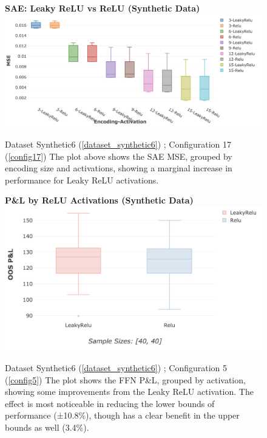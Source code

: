 \documentclass[a4paper,11pt,oneside]{article}
\theoremstyle{plain}
\theoremstyle{definition}
\begin{document}
	\begin{figure}[H]
		\centering 
		\textbf{SAE: Leaky ReLU vs ReLU (Synthetic Data)} 
		\includegraphics[scale=0.4]{images/results/8_appendix/synthetic_mse_leakyrelu.png}
		\caption[SAE: Leaky ReLU vs. ReLU (Synthetic Data)]{Dataset Synthetic6  (\ref{dataset_synthetic6}) ; Configuration 17 (\ref{config17})
			\newline The plot above shows the SAE MSE, grouped by encoding size and activations, showing a marginal increase in performance for Leaky ReLU activations. }
		\label{figure-synthetic_mse_leakyrelu}
	\end{figure}
	
	\begin{figure}[H]
		\textbf{P\&L by ReLU Activations (Synthetic Data)}
		\centering
		\includegraphics[scale=0.4]{images/results/8_appendix/synthetic_pl_leakyrelu.png}
		\caption[P\&L by ReLU Activations (Synthetic Data)]{Dataset Synthetic6  (\ref{dataset_synthetic6}) ; Configuration 5 (\ref{config5})
			\newline The plot shows the FFN P\&L, grouped by activation, showing some improvements from the Leaky ReLU activation. The effect is most noticeable in reducing the lower bounds of performance (±10.8\%), though has a clear benefit in the upper bounds as well (3.4\%).}
		\label{figure-synthetic_pl_leakyrelu}
	\end{figure}
\end{document}
